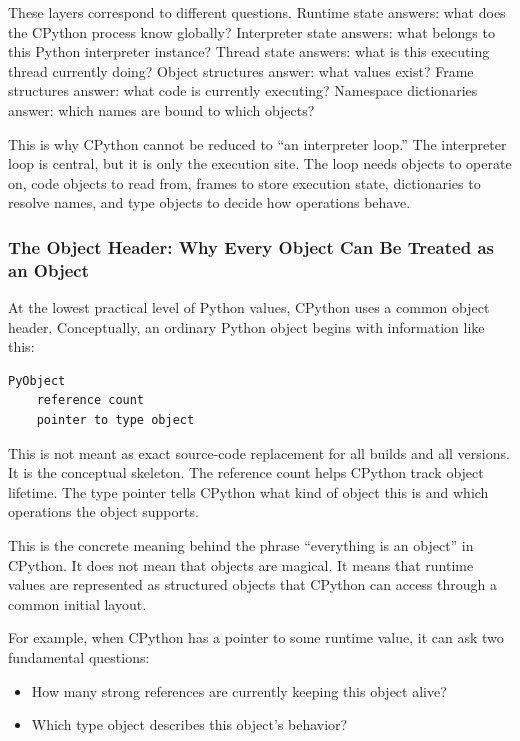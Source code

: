 These layers correspond to different questions. Runtime state answers: what does the CPython process know globally? Interpreter state answers: what belongs to this Python interpreter instance? Thread state answers: what is this executing thread currently doing? Object structures answer: what values exist? Frame structures answer: what code is currently executing? Namespace dictionaries answer: which names are bound to which objects?

This is why CPython cannot be reduced to ``an interpreter loop.'' The interpreter loop is central, but it is only the execution site. The loop needs objects to operate on, code objects to read from, frames to store execution state, dictionaries to resolve names, and type objects to decide how operations behave.

\subsubsection{The Object Header: Why Every Object Can Be Treated as an Object}

At the lowest practical level of Python values, CPython uses a common object header. Conceptually, an ordinary Python object begins with information like this:

\begin{verbatim}
PyObject
    reference count
    pointer to type object
\end{verbatim}

This is not meant as exact source-code replacement for all builds and all versions. It is the conceptual skeleton. The reference count helps CPython track object lifetime. The type pointer tells CPython what kind of object this is and which operations the object supports.

This is the concrete meaning behind the phrase ``everything is an object'' in CPython. It does not mean that objects are magical. It means that runtime values are represented as structured objects that CPython can access through a common initial layout.

For example, when CPython has a pointer to some runtime value, it can ask two fundamental questions:

\begin{itemize}
    \item How many strong references are currently keeping this object alive?
    \item Which type object describes this object's behavior?
\end{itemize}

